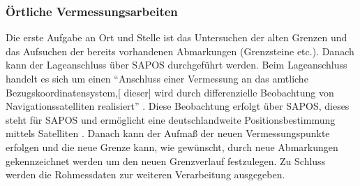 
\subsubsection{Örtliche Vermessungsarbeiten}

Die erste Aufgabe an Ort und Stelle ist das Untersuchen der alten Grenzen und das Aufsuchen der bereits vorhandenen Abmarkungen (Grenzsteine etc.).
Danach kann der Lageanschluss über \acs{SAPOS} durchgeführt werden. Beim Lageanschluss handelt es sich um einen "`Anschluss einer Vermessung an das amtliche Bezugskoordinatensystem,[ dieser] wird durch differenzielle Beobachtung von Navigationssatelliten realisiert"' \autocite{bier-lage}.
Diese Beobachtung erfolgt über \acs{SAPOS}, dieses steht für \acl{SAPOS} und ermöglicht eine deutschlandweite Positionsbestimmung mittels Satelliten \autocite[vgl.][2]{sapos-prospekt}. 
Danach kann der Aufmaß der neuen Vermessungspunkte  erfolgen und 
die neue Grenze kann, wie gewünscht, durch neue Abmarkungen gekennzeichnet werden um den neuen Grenzverlauf festzulegen. Zu Schluss werden die Rohmessdaten zur weiteren Verarbeitung ausgegeben.


